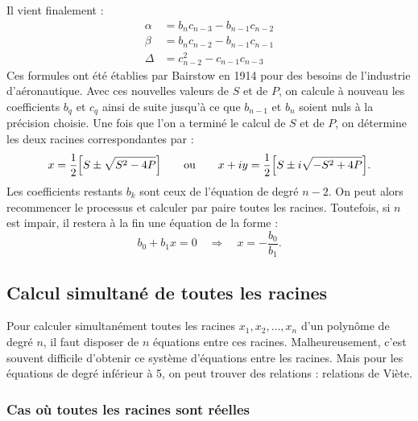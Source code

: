 Il vient finalement :
\[
  \begin{aligned}
    \alpha &= b_nc_{n-3} - b_{n-1}c_{n-2}\\
    \beta &= b_nc_{n-2} - b_{n-1}c_{n-1}\\
    \Delta &= c_{n-2}^2 - c_{n-1}c_{n-3}
  \end{aligned}
\]
Ces formules ont été établies par Bairstow en 1914 pour des besoins de
l'industrie d'aéronautique. Avec ces nouvelles valeurs de $S$ et de $P$, on
calcule à nouveau les coefficients $b_q$ et $c_q$ ainsi de suite jusqu'à ce
que $b_{n-1}$ et $b_n$ soient nuls à la précision choisie. Une fois que l'on a
terminé le calcul de $S$ et de $P$, on détermine les deux racines
correspondantes par :
\[
  x = \frac{1}{2}\Bigl[S \pm \sqrt{S^2 - 4P}\Bigr]
  \qquad\text{ou}\qquad
  x + iy = \frac{1}{2}\Bigl[S \pm i\sqrt{-S^2 + 4P}\Bigr] .
\]
Les coefficients restants $b_k$ sont ceux de l'équation de degré $n-2$. On peut
alors recommencer le processus et calculer par paire toutes les racines.
Toutefois, si $n$ est impair, il restera à la fin une équation de la forme :
\[
  b_0 + b_1x = 0 \quad\Longrightarrow\quad x = -\frac{b_0}{b_1} .
\]

\subsection{Calcul simultané de toutes les racines}

Pour calculer simultanément toutes les racines $x_1, x_2, \dots, x_n$ d'un
polynôme de degré $n$, il faut disposer de $n$ équations entre ces racines.
Malheureusement, c'est souvent difficile d'obtenir ce système d'équations
entre les racines. Mais pour les équations de degré inférieur à 5, on peut
trouver des relations : relations de Viète.

\subsubsection{Cas où toutes les racines sont réelles}

